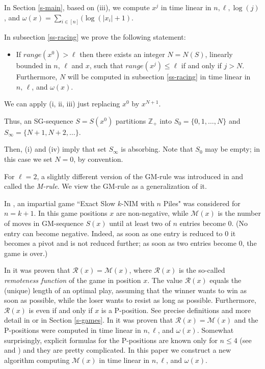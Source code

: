 \documentclass[10pt]{article}
\theoremstyle{definition}
\def\R{\mathcal{R}}
\def\M{\mathcal{M}}
\def\ZZ{\mathbb{Z}}
\begin{document}
In Section \ref{s-main}, based on (iii), 
we compute $x^j$ in time linear in  
$n, \ell, \log(j)$, and 
$\omega(x) = \sum_{i \in [n]}(\log(|x_i| + 1)$.

In subsection \ref{ss-racing} we prove the following statement: 

\begin{itemize}
\item[(iv)] 
If $range(x^0) > \ell$ then 
there exists an integer $N = N(S)$,   
linearly bounded in  $n, \, \ell$ and $x$, 
such that $range(x^j) \leq \ell$ if and only if  $j > N$. 
Furthermore, $N$  will be computed in subsection \ref{ss-racing} 
in time linear in $n, \, \ell$, and  $\omega(x)$.
\end{itemize}

We can apply (i, ii, iii) just replacing $x^0$ by $x^{N+1}$.   

Thus, an SG-sequence $S = S(x^0)$ partitions  $\ZZ_+$ into  $S_0 = \{0, 1, \ldots, N\}$ and $S_\infty =\{N+1,N+2,\ldots\}$. 

Then, (i) and (iv) imply that set $S_\infty$ is absorbing. 
Note that $S_0$  may be empty;  
in this case we set $N = 0$, by convention. 

\medskip 

For $\ell = 2$, a slightly different version of the GM-rule 
was introduced in \cite{GMMV23} and called the {\em M-rule}. 
We view the GM-rule as a generalization of it.

In \cite{GMMV23}, an impartial game 
``Exact Slow $k$-NIM with $n$ Piles"  
was considered for $n = k+1$. 
In this game positions $x$  are non-negative,  
while  $\M(x)$  is the number of moves in GM-sequence  $S(x)$ 
until at least two of $n$ entries become  0. 
(No entry can become negative. 
Indeed, as soon as one entry is reduced to $0$ 
it becomes a pivot and is not reduced further;  
as soon as two entries become 0, the game is over.) 

In \cite{GMMV23} it was proven that $\R(x) = \M(x)$, 
where  $\R(x)$  is the so-called 
{\em remoteness function}  \cite{Smi66} 
of the game in position $x$. 
The value $\R(x)$  equals the (unique) length 
of an optimal play, 
assuming that the winner wants to win as soon as possible, 
while the loser wants to resist as long as possible. 
Furthermore, $\R(x)$ is even 
if and only if $x$ is a P-position. 
See precise definitions and more detail  
in \cite{GMMV23} or in Section \ref{s-games}.  
In \cite{GMMV23} it was proven that 
$\R(x) = \M(x)$ and the P-positions  
were computed in time linear in $n, \ell$, and $\omega(x)$. 
Somewhat surprisingly,  
explicit formulas for the P-positions 
are known only for $n \leq 4$ 
(see \cite{GHHC20} and \cite[Appendix]{GMMV23})  
and they are pretty complicated. 
In this paper we construct a new algorithm 
computing  $\M(x)$ in time linear in $n, \ell$, and  $\omega(x)$.
\end{document}
